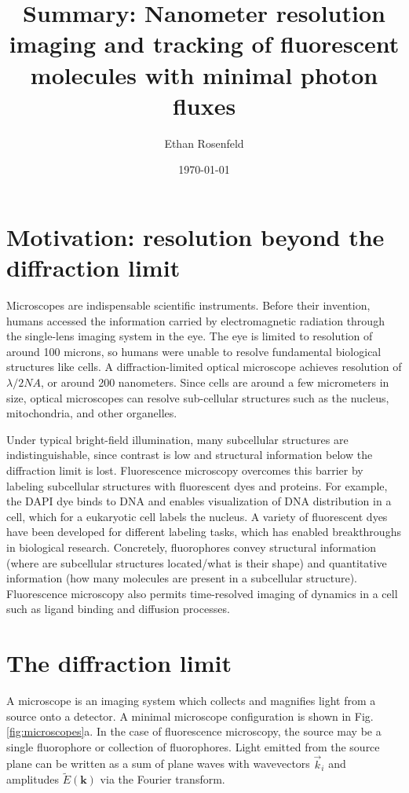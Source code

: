 \documentclass[12pt]{article}
\title{Summary: Nanometer resolution imaging and tracking of fluorescent molecules with minimal photon fluxes}
\author{Ethan Rosenfeld}
\date{\today}
\begin{document}
\maketitle
\thispagestyle{empty}
\tableofcontents
\newpage

\section{Motivation: resolution beyond the diffraction limit}
Microscopes are indispensable scientific instruments. Before their invention, humans accessed the information carried by electromagnetic radiation through the single-lens imaging system in the eye. The eye is limited to resolution of around 100 microns, so humans were unable to resolve fundamental biological structures like cells. A diffraction-limited optical microscope achieves resolution of $\lambda / 2 NA$, or around 200 nanometers. Since cells are around a few micrometers in size, optical microscopes can resolve sub-cellular structures such as the nucleus, mitochondria, and other organelles. 

Under typical bright-field illumination, many subcellular structures are indistinguishable, since contrast is low and structural information below the diffraction limit is lost. Fluorescence microscopy overcomes this barrier by labeling subcellular structures with fluorescent dyes and proteins. For example, the DAPI dye binds to DNA and enables visualization of DNA distribution in a cell, which for a eukaryotic cell labels the nucleus. A variety of fluorescent dyes have been developed for different labeling tasks, which has enabled breakthroughs in biological research. Concretely, fluorophores convey structural information (where are subcellular structures located/what is their shape) and quantitative information (how many molecules are present in a subcellular structure). Fluorescence microscopy also permits time-resolved imaging of dynamics in a cell such as ligand binding and diffusion processes.


\section{The diffraction limit}

A microscope is an imaging system which collects and magnifies light from a source onto a detector. A minimal microscope configuration is shown in Fig. \ref{fig:microscopes}a. In the case of fluorescence microscopy, the source may be a single fluorophore or collection of fluorophores. Light emitted from the source plane can be written as a sum of plane waves with wavevectors $\vec{k}_i$ and amplitudes $\tilde{E}(\mathbf{k})$ via the Fourier transform.
\end{document}
